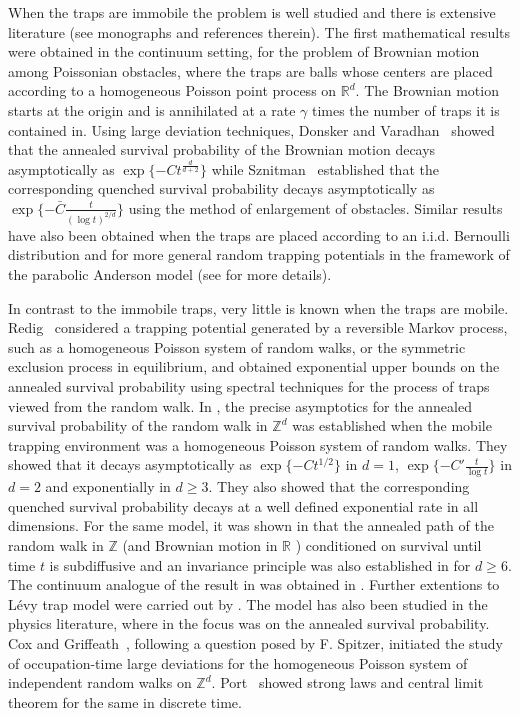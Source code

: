 \documentclass{article}[12pt]
\theoremstyle{definition}
\newcommand{\R}{\mathbb{R}}
\newcommand{\Z}{\mathbb{Z}}
\newcommand{\1}{\mathbbm{1}}
\begin{document}
When the traps are immobile the problem is well studied and there is extensive literature (see monographs \cite{S1998, K2016} and references therein). The first mathematical results were obtained in the continuum setting, for the problem of Brownian motion among Poissonian obstacles, where the traps are balls whose centers are placed according to a homogeneous Poisson point process on $\R^d$. The Brownian motion starts at the origin and is annihilated at a rate $\gamma$ times the number of traps it is contained in. Using large deviation techniques, Donsker and Varadhan~\cite{DV1975} showed that the annealed survival probability of the Brownian motion decays asymptotically as $\exp\{-C t^{\frac{d}{d+2}}\}$ while Sznitman~\cite{S1998} established that the corresponding quenched survival probability decays asymptotically as $\exp\{-\bar{C} \frac{t}{(\log t)^{2/d}}\}$
using the method of enlargement of obstacles. Similar results have also been obtained when the traps are placed according to an i.i.d. Bernoulli distribution \cite{A1995, B1994, DV1979} and for more general random trapping potentials in the framework of the parabolic Anderson model (see \cite{K2016} for more details).  

In contrast to the immobile traps, very little is known when the traps are mobile.  Redig~\cite{R1994} considered a trapping potential generated by a reversible Markov process, such as a homogeneous Poisson system of random walks, or the symmetric exclusion process in equilibrium, and obtained exponential upper bounds on the annealed survival probability using spectral techniques for the process of traps viewed from the random walk. In \cite{DGRS2012}, the precise asymptotics for the annealed survival probability of the random walk in $\Z^d$ was established when the mobile trapping environment was a homogeneous Poisson system of random walks. They showed that it decays 
asymptotically as $\exp\{-C t^{1/2}\}$ in $d=1$, $\exp\{-C' {\frac{t}{\log t}}\}$ in $d=2$ and exponentially in $d\ge 3$. They also showed that the corresponding quenched survival probability decays at a well defined exponential rate in all dimensions. For the same model, it was shown in \cite{ADS2017} that the annealed path of the random walk in $\Z$ (and Brownian motion in $\R$ \cite{Oz2019}) conditioned on survival until time $t$ is subdiffusive and an invariance principle was also established in \cite{ADS2025} for $d\ge 6$. The continuum analogue of the result in \cite{DGRS2012} was obtained in \cite{PSSS2013}. Further extentions to L\'evy trap model were carried out by \cite{DSS2014}. The model has also been studied in the physics literature, where in  \cite{MOBC2003, MOBC2004} the focus was on the annealed survival probability. 
Cox and Griffeath~\cite{CG1984}, following a question posed by F. Spitzer, initiated the study of occupation-time large deviations for the homogeneous Poisson system of independent random walks on $\mathbb{Z}^d$. Port~\cite{P1966, P1967} showed strong laws and central limit theorem for the same in discrete time. 
\end{document}
